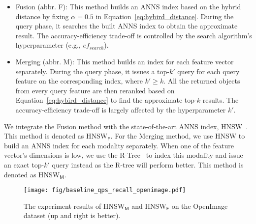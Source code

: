 \begin{itemize}[leftmargin=*, topsep=0pt]
    \item \textsf{Fusion (abbr. F)}: This method builds an ANNS index based on the hybrid distance by fixing $\alpha = 0.5$ in Equation~\ref{eq:hybird_distance}. During the query phase, it searches the built 
    ANNS index %
    to obtain the approximate result. The accuracy-efficiency trade-off is controlled by the search algorithm's hyperparameter (e.g., $ef_{search}$).
    \item \textsf{Merging (abbr. M)}: This method builds an index for each
    feature vector separately. During the query %
    phase, it issues a top-$k'$ query for each query feature 
    on the corresponding index, where $k' \geq k$. All the returned 
    objects from every query feature are then reranked based on Equation~\ref{eq:hybird_distance} to find the approximate top-$k$ results. The accuracy-efficiency trade-off is largely affected by the hyperparameter $k'$.
\end{itemize}
We integrate the \textsf{Fusion} method with the state-of-the-art ANNS index, \textsf{HNSW}~\cite{malkovEfficientRobustApproximate2020}. %
This method is denoted as \textsf{HNSW}$_{\textsf{F}}$. For the \textsf{Merging} method, we use \textsf{HNSW} to build an ANNS index for each modality separately. When one of the feature vector's dimensions is low, 
we use the R-Tree~\cite{beckmann1990r} to index this modality and issue an exact top-$k'$ query instead 
%
as the R-tree will perform better. This method is denoted as \textsf{HNSW}$_{\textsf{M}}$.

\begin{figure}[!t]
\centering
\texttt{[image: fig/baseline\_qps\_recall\_openimage.pdf]}
\vspace*{-1em}
\caption{The experiment results of \textsf{HNSW}$_{\textsf{M}}$ and 
\textsf{HNSW}$_{\textsf{F}}$ on the OpenImage dataset (up and right is better).}
\label{fig:exp-motivation}
\vspace*{-1em}
\end{figure}

